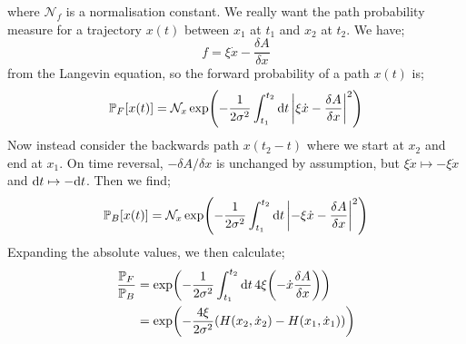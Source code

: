where $\mathcal{N}_f$ is a normalisation constant. We really want the path probability measure for a trajectory $x(t)$ between $x_1$ at $t_1$ and $x_2$ at $t_2$. We have;
\begin{equation*}
f = \xi \dot{x} - \frac{\delta A}{\delta x}
\end{equation*}
from the Langevin equation, so the forward probability of a path $x(t)$ is;
\begin{equation}
\mathbb{P}_F[x(t)] = \mathcal{N}_x\exp\left(-\frac{1}{2\sigma^2}\int_{t_1}^{t_2}{\upd{t}\abs{\xi \dot{x} - \frac{\delta A}{\delta x}}^2}\right)
\end{equation}
Now instead consider the backwards path $x(t_2 - t)$ where we start at $x_2$ and end at $x_1$. On time reversal, $-\delta A/\delta x$ is unchanged by assumption, but $\xi \dot{x} \mapsto - \xi \dot{x}$ and $\text{d} t \mapsto -\text{d} t$. Then we find;
\begin{equation}
\mathbb{P}_B[x(t)] = \mathcal{N}_x \exp\left(-\frac{1}{2\sigma^2}\int_{t_1}^{t_2}{\upd{t}\abs{-\xi \dot{x} - \frac{\delta A}{\delta x}}^2}\right)
\end{equation}
Expanding the absolute values, we then calculate;\footnotemark
{}
\begin{align*}
\frac{\mathbb{P}_F}{\mathbb{P}_B} &= \exp\left(-\frac{1}{2\sigma^2}\int_{t_1}^{t_2}{\upd{t}4\xi \left(-\dot{x}\frac{\delta A}{\delta x}\right)}\right) \\
&= \exp\left(-\frac{4\xi}{2\sigma^2}\left(H(x_2, \dot{x}_2) - H(x_1, \dot{x}_1)\right)\right)
\end{align*}
